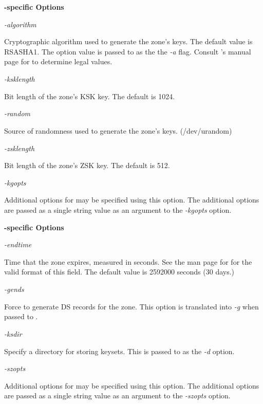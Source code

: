 {\bf {}-specific Options}

\begin{description}

\item {\it -algorithm}\verb" "

Cryptographic algorithm used to generate the zone's keys.  The default value
is RSASHA1.  The option value is passed to  as the the {\it
-a} flag.  Consult 's manual page for to determine legal
values.

\item {\it -ksklength}\verb" "

Bit length of the zone's KSK key.
The default is 1024.

\item {\it -random}\verb" "

Source of randomness used to generate the zone's keys.	(/dev/urandom)

\item {\it -zsklength}\verb" "

Bit length of the zone's ZSK key.
The default is 512.

\item {\it -kgopts}\verb" "

Additional options for  may be specified using this option.
The additional options are passed as a single string value as an argument to
the {\it -kgopts} option.

\end{description}

{\bf {}-specific Options}

\begin{description}

\item {\it -endtime}\verb" "

Time that the zone expires, measured in seconds.  See the man page for
 for the valid format of this field.
The default value is 2592000 seconds (30 days.)

\item {\it -gends}\verb" "

Force  to generate DS records for the zone.  This option
is translated into {\it -g} when passed to .

\item {\it -ksdir}\verb" "

Specify a directory for storing keysets.  This is passed to
 as the {\it -d} option.

\item {\it -szopts}\verb" "

Additional options for  may be specified using this
option.  The additional options are passed as a single string value as an
argument to the {\it -szopts} option.

\end{description}

